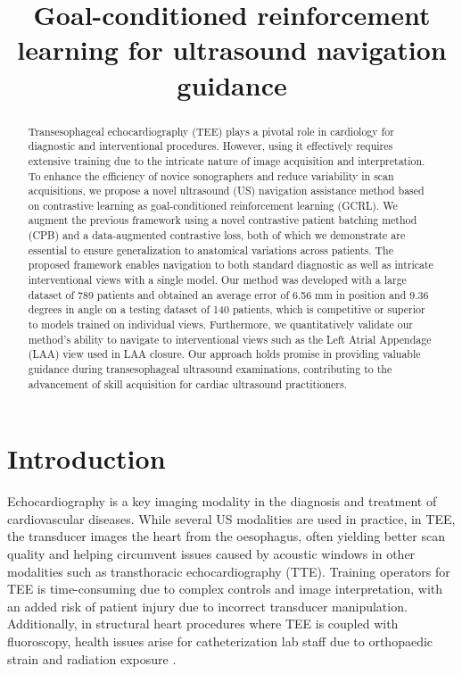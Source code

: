 
\title{Goal-conditioned reinforcement learning for ultrasound navigation guidance}
\maketitle              \begin{abstract}
Transesophageal echocardiography (TEE) plays a pivotal role in cardiology for diagnostic and interventional procedures. However, using it effectively requires extensive training due to the intricate nature of image acquisition and interpretation. To enhance the efficiency of novice sonographers and reduce variability in scan acquisitions, we propose a novel ultrasound (US) navigation assistance method based on contrastive learning as goal-conditioned reinforcement learning (GCRL). We augment the previous framework using a novel contrastive patient batching method (CPB) and a data-augmented contrastive loss, both of which we demonstrate are essential to ensure generalization to anatomical variations across patients. The proposed framework enables navigation to both standard diagnostic as well as intricate interventional views with a single model. Our method was developed with a large dataset of 789 patients and obtained an average error of 6.56 mm in position and 9.36 degrees in angle on a testing dataset of 140 patients, which is competitive or superior to models trained on individual views. Furthermore, we quantitatively validate our method's ability to navigate to interventional views such as the Left Atrial Appendage (LAA) view used in LAA closure. Our approach holds promise in providing valuable guidance during transesophageal ultrasound examinations, contributing to the advancement of skill acquisition for cardiac ultrasound practitioners.\protect{}

\end{abstract}

\section{Introduction}

Echocardiography is a key imaging modality in the diagnosis and treatment of cardiovascular diseases. While several US modalities are used in practice, in TEE, the transducer images the heart from the oesophagus, often yielding better scan quality and helping circumvent issues caused by acoustic windows in other modalities such as transthoracic echocardiography (TTE). Training operators for TEE is time-consuming due to complex controls and image interpretation, with an added risk of patient injury due to incorrect transducer manipulation. Additionally, in structural heart procedures where TEE is coupled with fluoroscopy, health issues arise for catheterization lab staff due to orthopaedic strain and radiation exposure \cite{Andreassi2016OccupationalHR}.

